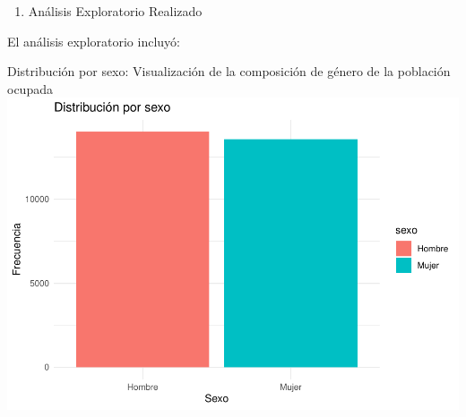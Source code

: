 \documentclass[Royal,times,sageh]{sagej}
\providecommand{\tightlist}{%
  \setlength{\itemsep}{0pt}\setlength{\parskip}{0pt}}
\begin{document}
\begin{enumerate}
\def\labelenumi{\arabic{enumi}.}
\setcounter{enumi}{2}
\tightlist
\item
  Análisis Exploratorio Realizado
\end{enumerate}

El análisis exploratorio incluyó:

Distribución por sexo: Visualización de la composición de género de la
población ocupada
\includegraphics{Articulo_files/figure-latex/unnamed-chunk-3-1.pdf}
\end{document}
